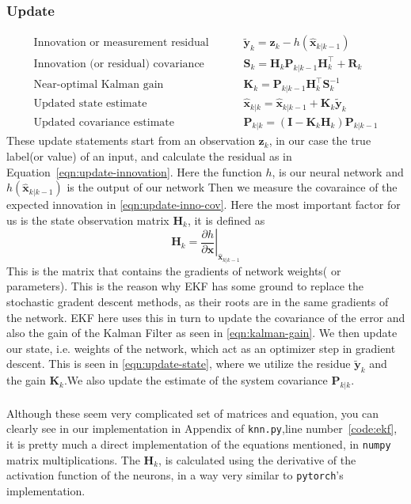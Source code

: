 \documentclass{article}
\begin{document}
\subsubsection{Update}

\begin{align}
    \textrm{Innovation or measurement residual	}\qquad & \tilde{\boldsymbol{y}}_{k}=\boldsymbol{z}_{k}-h\left(\hat{\boldsymbol{x}}_{k | k-1}\right) \label{eqn:update-innovation} \\
    \textrm{Innovation (or residual) covariance	} \qquad & \boldsymbol{S}_{k}=\boldsymbol{H}_{k} \boldsymbol{P}_{k | k-1} \boldsymbol{H}_{k}^{\top}+\boldsymbol{R}_{k} \label{eqn:update-inno-cov}\\
    \textrm{Near-optimal Kalman gain}\qquad & \boldsymbol{K}_{k}=\boldsymbol{P}_{k | k-1} \boldsymbol{H}_{k}^{\top} \boldsymbol{S}_{k}^{-1} \label{eqn:kalman-gain}\\
    \textrm{Updated state estimate	}\qquad &\hat{\boldsymbol{x}}_{k | k}=\hat{\boldsymbol{x}}_{k | k-1}+\boldsymbol{K}_{k} \tilde{\boldsymbol{y}}_{k} \label{eqn:update-state} \\
    \textrm{Updated covariance estimate} \qquad & \boldsymbol{P}_{k | k}=\left(\boldsymbol{I}-\boldsymbol{K}_{k} \boldsymbol{H}_{k}\right) \boldsymbol{P}_{k | k-1} \label{eqn:update-cov}
\end{align}
These update statements start from an observation $\boldsymbol{z}_k$, in our case the true label(or value) of an input, and calculate the residual as in Equation~\eqref{eqn:update-innovation}. Here the function $h$, is our neural network and $h(\hat{\boldsymbol{x}}_{k | k-1})$ is the output of our network Then we measure the covaraince of the expected innovation in \eqref{eqn:update-inno-cov}. Here the most important factor for us is the state observation matrix $\boldsymbol{H}_k$, it is defined as 
\[ 
\boldsymbol{H}_{k}=\left.\frac{\partial h}{\partial \boldsymbol{x}}\right|_{\hat{\boldsymbol{x}}_{k | k-1}}
\]
This is the matrix that contains the gradients of network weights( or parameters). This is the reason why EKF has some ground to replace the stochastic gradent descent methods, as their roots are in the same gradients of the network. EKF here uses this in turn to update the covariance of the error and also the gain of the Kalman Filter as seen in \eqref{eqn:kalman-gain}. We then update our state, i.e. weights of the network, which act as an optimizer step in gradient descent. This is seen in \eqref{eqn:update-state}, where we utilize the residue $\tilde{\boldsymbol{y}}_k$ and the gain $\boldsymbol{K}_k$.We also update the estimate of the system covariance $\boldsymbol{P}_{k|k}$.
\\ \\
Although these seem very complicated set of matrices and equation, you can clearly see in our implementation in Appendix of \texttt{knn.py},line number~\ref{code:ekf}, it is pretty much a direct implementation of the equations mentioned, in \texttt{numpy} matrix multiplications. The $\boldsymbol{H}_k$, is calculated using the derivative of the activation function of the neurons, in a way very similar to \texttt{pytorch}'s implementation. 
\end{document}
